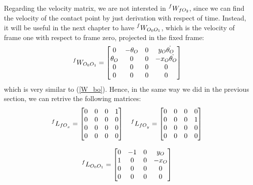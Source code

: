 \documentclass[a4paper,12pt,oneside]{report}
\begin{document}
Regarding the velocity matrix, we are not intersted in $\prescript{f}{}{W_{fO_2}}$, since we can find the velocity of the contact point by just derivation with respect of time. Instead, it will be useful in the next chapter to have $\prescript{f}{}{W_{O_0O_1}}$, which is the velocity of frame one with respect to frame zero, projected in the fixed frame:
\begin{equation}
  \prescript{f}{}{W_{O_0O_1}}=\begin{bmatrix}
    0&-\theta_O&0&y_O \dot{\theta_O}\\
    \theta_O&0&0&-x_O \dot{\theta_O}\\
    0&0&0&0\\
    0&0&0&0
  \end{bmatrix}
\end{equation}
which is very similar to (\ref{W_bo}). Hence, in the same way we did in the previous section, we can retrive the following matrices:
\begin{equation}
  \begin{array}{c}
    \prescript{f}{}{L_{{fO}_x}}=\begin{bmatrix}
      0&0&0&1\\
      0&0&0&0\\
      0&0&0&0\\
      0&0&0&0
    \end{bmatrix} \quad
    \prescript{f}{}{L_{{fO}_y}}=\begin{bmatrix}
      0&0&0&0\\
      0&0&0&1\\
      0&0&0&0\\
      0&0&0&0
    \end{bmatrix}\\ \\
    \prescript{f}{}{L_{O_0O_1}}=\begin{bmatrix}
      0&-1&0&y_O\\
      1&0&0&-x_O\\
      0&0&0&0\\
      0&0&0&0
    \end{bmatrix}
  \end{array}
\end{equation}
\end{document}
